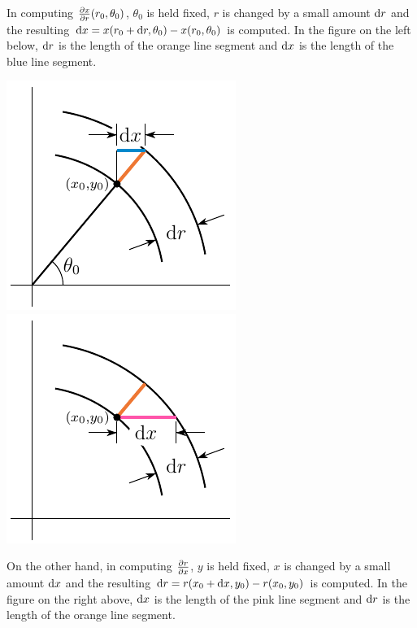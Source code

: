\begin{eg}
In computing $\pdiff{x}{r}(r_0,\theta_0)$, $\theta_0$ is held
fixed, $r$ is changed by a small amount $\mathrm{d}r$ and the resulting 
$\mathrm{d}x=x(r_0+\mathrm{d}r,\theta_0) - x(r_0,\theta_0)$ is computed.
In the figure on the left below, $\mathrm{d}r$ is the length of the orange
line segment and $\mathrm{d}x$ is the length of the blue line segment.
\begin{efig}
\begin{center}
   \includegraphics{dxdrdrdx1}\qquad\qquad
   \includegraphics{dxdrdrdx2}\qquad
\end{center}
\end{efig}
On the other hand, in computing $\pdiff{r}{x}$, $y$ is held fixed, 
$x$ is changed by a small amount $\mathrm{d}x$ and the resulting 
$\mathrm{d}r=r(x_0+\mathrm{d}x,y_0) - r(x_0,y_0)$  is computed. In the figure on 
the right above, $\mathrm{d}x$ is the length of the pink line segment and
$\mathrm{d}r$ is the length of the orange line segment.


\end{eg}
